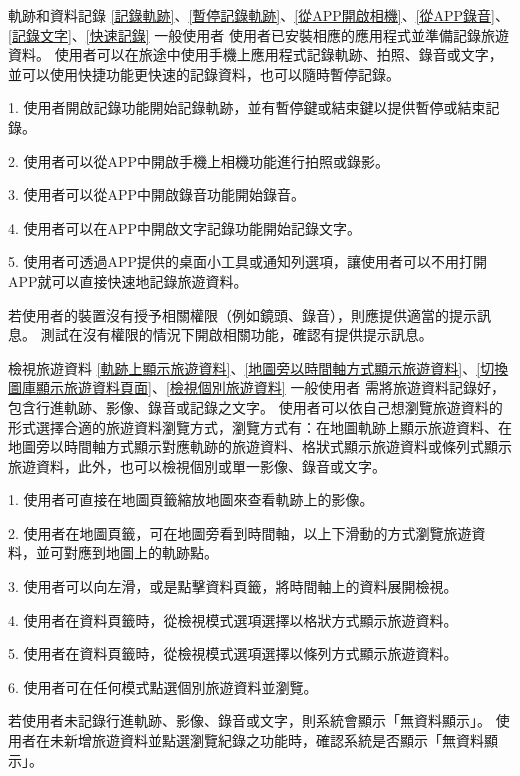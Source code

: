 \addUsecase
  {軌跡和資料記錄}
  {\ref{記錄軌跡}、\ref{暫停記錄軌跡}、\ref{從APP開啟相機}、\ref{從APP錄音}、\ref{記錄文字}、\ref{快速記錄}}
  {一般使用者}
  {使用者已安裝相應的應用程式並準備記錄旅遊資料。}
  {使用者可以在旅途中使用手機上應用程式記錄軌跡、拍照、錄音或文字，並可以使用快捷功能更快速的記錄資料，也可以隨時暫停記錄。}
  {
    1. 使用者開啟記錄功能開始記錄軌跡，並有暫停鍵或結束鍵以提供暫停或結束記錄。

    2. 使用者可以從APP中開啟手機上相機功能進行拍照或錄影。

    3. 使用者可以從APP中開啟錄音功能開始錄音。

    4. 使用者可以在APP中開啟文字記錄功能開始記錄文字。

    5. 使用者可透過APP提供的桌面小工具或通知列選項，讓使用者可以不用打開APP就可以直接快速地記錄旅遊資料。
  }
  {若使用者的裝置沒有授予相關權限（例如鏡頭、錄音），則應提供適當的提示訊息。}
  {測試在沒有權限的情況下開啟相關功能，確認有提供提示訊息。}

\addUsecase
  {檢視旅遊資料}
  {\ref{軌跡上顯示旅遊資料}、\ref{地圖旁以時間軸方式顯示旅遊資料}、\ref{切換圖庫顯示旅遊資料頁面}、\ref{檢視個別旅遊資料}}
  {一般使用者}
  {需將旅遊資料記錄好，包含行進軌跡、影像、錄音或記錄之文字。}
  {使用者可以依自己想瀏覽旅遊資料的形式選擇合適的旅遊資料瀏覽方式，瀏覽方式有：在地圖軌跡上顯示旅遊資料、在地圖旁以時間軸方式顯示對應軌跡的旅遊資料、格狀式顯示旅遊資料或條列式顯示旅遊資料，此外，也可以檢視個別或單一影像、錄音或文字。}
  {
    1. 使用者可直接在地圖頁籤縮放地圖來查看軌跡上的影像。

    2. 使用者在地圖頁籤，可在地圖旁看到時間軸，以上下滑動的方式瀏覽旅遊資料，並可對應到地圖上的軌跡點。

    3. 使用者可以向左滑，或是點擊資料頁籤，將時間軸上的資料展開檢視。

    4. 使用者在資料頁籤時，從檢視模式選項選擇以格狀方式顯示旅遊資料。

    5. 使用者在資料頁籤時，從檢視模式選項選擇以條列方式顯示旅遊資料。

    6. 使用者可在任何模式點選個別旅遊資料並瀏覽。
  }
  {若使用者未記錄行進軌跡、影像、錄音或文字，則系統會顯示「無資料顯示」。}
  {使用者在未新增旅遊資料並點選瀏覽紀錄之功能時，確認系統是否顯示「無資料顯示」。}


